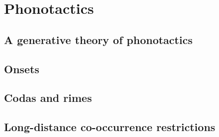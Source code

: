 \chapter{Phonotactics}

\citet{Sommerstein1974}

\section{A generative theory of phonotactics}

\section{Onsets}

\section{Codas and rimes}

\section{Long-distance co-occurrence restrictions}
